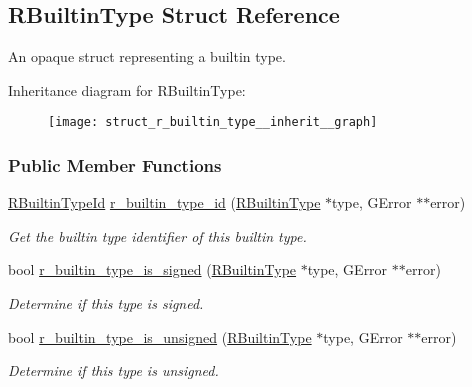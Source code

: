 \hypertarget{struct_r_builtin_type}{\subsection{R\-Builtin\-Type Struct Reference}
\label{struct_r_builtin_type}
}


An opaque struct representing a builtin type.  




Inheritance diagram for R\-Builtin\-Type\-:\nopagebreak
\begin{figure}[H]
\begin{center}
\leavevmode
\texttt{[image: struct\_r\_builtin\_type\_\_inherit\_\_graph]}
\end{center}
\end{figure}
\subsubsection*{Public Member Functions}
\begin{DoxyCompactItemize}
\item 
\hyperlink{builtin__type_8h_a245d1724f16dd995c090e6666722c80c}{R\-Builtin\-Type\-Id} \hyperlink{struct_r_builtin_type_afaf0b8970072c1587ebc7936eaccbcee}{r\-\_\-builtin\-\_\-type\-\_\-id} (\hyperlink{struct_r_builtin_type}{R\-Builtin\-Type} $\ast$type, G\-Error $\ast$$\ast$error)
\begin{DoxyCompactList}\small\item\em Get the builtin type identifier of this builtin type. \end{DoxyCompactList}\item 
bool \hyperlink{struct_r_builtin_type_a93b47b692eee1bdead79045599b47c1f}{r\-\_\-builtin\-\_\-type\-\_\-is\-\_\-signed} (\hyperlink{struct_r_builtin_type}{R\-Builtin\-Type} $\ast$type, G\-Error $\ast$$\ast$error)
\begin{DoxyCompactList}\small\item\em Determine if this type is signed. \end{DoxyCompactList}\item 
bool \hyperlink{struct_r_builtin_type_a539615767bc3af7470da1e73456bfe10}{r\-\_\-builtin\-\_\-type\-\_\-is\-\_\-unsigned} (\hyperlink{struct_r_builtin_type}{R\-Builtin\-Type} $\ast$type, G\-Error $\ast$$\ast$error)
\begin{DoxyCompactList}\small\item\em Determine if this type is unsigned. \end{DoxyCompactList}\end{DoxyCompactItemize}


